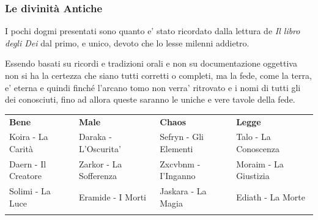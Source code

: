 \documentclass[a4paper,11pt,twoside,openany]{book}
\begin{document}
\subsubsection{Le divinità Antiche}

I pochi dogmi presentati sono quanto e' stato ricordato dalla lettura de \textit{Il libro degli Dei} dal primo, e unico, devoto che lo lesse milenni addietro.

Essendo basati su ricordi e tradizioni orali e non su documentazione oggettiva non si ha la certezza che siano tutti corretti o completi, ma la fede, come la terra, e' eterna e quindi finché l'arcano tomo non verra' ritrovato e i nomi di tutti gli dei conosciuti, fino ad allora queste saranno le uniche e vere tavole della fede.

\begin{longtable}[]{@{}llll@{}}
	\toprule
	\endhead
	\textbf{Bene} & \textbf{Male} & \textbf{Chaos} & \textbf{Legge}\tabularnewline
	\begin{minipage}[t]{0.22\columnwidth}\raggedright
		Koira - La Carità\strut
	\end{minipage} & \begin{minipage}[t]{0.22\columnwidth}\raggedright
		Daraka - L'Oscurita'\strut
	\end{minipage} & \begin{minipage}[t]{0.22\columnwidth}\raggedright
		Sefryn - Gli Elementi\strut
	\end{minipage} & \begin{minipage}[t]{0.22\columnwidth}\raggedright
		Talo - La Conoscenza\strut
	\end{minipage}\tabularnewline
	Daern - Il Creatore & Zarkor - La Sofferenza & Zxcvbnm - I'Inganno &
	Moraim - La Giustizia\tabularnewline
	\begin{minipage}[t]{0.22\columnwidth}\raggedright
		Solimi - La Luce\strut
	\end{minipage} & \begin{minipage}[t]{0.22\columnwidth}\raggedright
		Eramide - I Morti\strut
	\end{minipage} & \begin{minipage}[t]{0.22\columnwidth}\raggedright
		Jaskara - La Magia\strut
	\end{minipage} & \begin{minipage}[t]{0.22\columnwidth}\raggedright
		Ediath - La Morte\strut
	\end{minipage}\tabularnewline
	\begin{minipage}[t]{0.22\columnwidth}\raggedright

\end{minipage}
\end{longtable}
\end{document}
